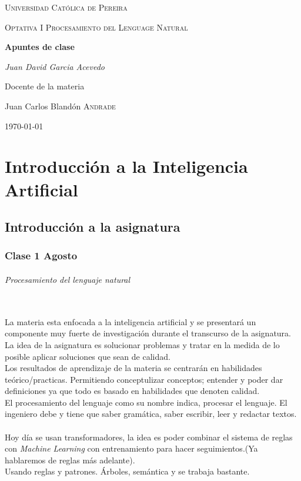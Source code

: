 \documentclass[a4paper]{report} %
\begin{document}
  \begin{titlepage}
    \centering
    {\scshape\LARGE Universidad Católica de Pereira\par}
    \vfill
    {\scshape\LARGE Optativa I Procesamiento del Lenguage Natural\par}
    \vfill
    {\huge\bfseries Apuntes de clase\par}
    \vfill
    {\Large\itshape Juan David Garcia Acevedo\par}
    \vfill
    Docente de la materia\par
	   Juan Carlos Blandón \textsc{Andrade}
    \vfill
    {\Large\today\par}
  \end{titlepage}
  \tableofcontents %
    \part{Introducción a la Inteligencia Artificial}
      \chapter{Introducción a la asignatura}
        \section{Clase 1 Agosto}
            \paragraph{Procesamiento del lenguaje natural}\mbox{} \\
              La materia esta enfocada a la inteligencia artificial y se presentará un componente muy fuerte de investigación durante el transcurso de la asignatura.
La idea de la asignatura es solucionar problemas y tratar en la medida de lo posible aplicar soluciones que sean de calidad.
              \\Los resultados de aprendizaje de la materia se centrarán en habilidades teórico/practicas. Permitiendo conceptulizar conceptos; entender y poder dar definiciones ya que todo es basado en habilidades que denoten calidad.
              \\El procesamiento del lenguaje como su nombre indica, procesar el lenguaje. El ingeniero debe y tiene que saber gramática, saber escribir, leer y redactar textos.
              \\\\Hoy día se usan transformadores, la idea es poder combinar el sistema de reglas con \textit{Machine Learning} con entrenamiento para hacer seguimientos.(Ya hablaremos de reglas más adelante).\\Usando reglas y patrones. Árboles, semántica y se trabaja bastante.
\end{document}
